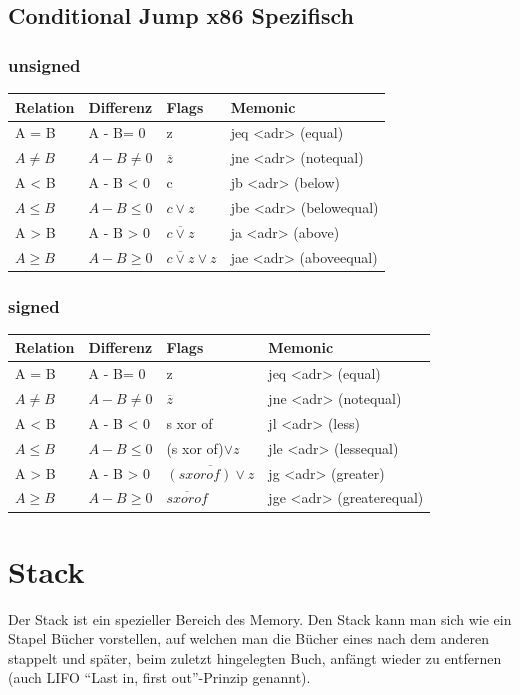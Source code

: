 \documentclass[a4paper,10pt]{report}
\begin{document}
\subsection{Conditional Jump x86 Spezifisch}
\subsubsection{unsigned}
\begin{tabularx}{\textwidth}{l l l l}
Relation&Differenz&Flags&Memonic\\ \hline
A = B & A - B= 0& z & jeq <adr> (equal)\\
$A \not = B$&$A - B \not = 0$& $\overline{z}$&  jne <adr> (notequal)\\  
A < B & A - B < 0 & c & jb <adr> (below)\\
$A \leq B$& $A - B \leq 0$& $c \lor z$ & jbe <adr> (belowequal)\\
 A > B & A - B > 0 &$ \overline{c\lor z}$ & ja <adr> (above)\\
$A \geq B$& $A - B \geq 0$& $ \overline{c\lor z} \lor z$ & jae <adr> (aboveequal)\\
\end{tabularx}
\subsubsection{signed}
\begin{tabularx}{\textwidth}{l l l l}
Relation&Differenz&Flags&Memonic\\ \hline
A = B & A - B= 0& z & jeq <adr> (equal)\\
$A \not = B$&$A - B \not = 0$& $\overline{z}$&  jne <adr> (notequal)\\  
A < B & A - B < 0 & s xor of & jl <adr> (less)\\
$A \leq B$& $A - B \leq 0$& (s xor of)$\lor z $ & jle <adr> (lessequal)\\
 A > B & A - B > 0 &$ \overline{(s xor of)\lor z }$ & jg <adr> (greater)\\
$A \geq B$& $A - B \geq 0$& $ \overline{s xor of}$ & jge <adr> (greaterequal)\\
\end{tabularx}
\section{Stack}
Der Stack ist ein spezieller Bereich des Memory. Den Stack kann man sich wie ein Stapel Bücher vorstellen, auf welchen man die Bücher eines nach dem anderen stappelt und später, beim zuletzt hingelegten Buch, anfängt wieder zu entfernen (auch LIFO "`Last in, first out"'-Prinzip genannt).
\end{document}
